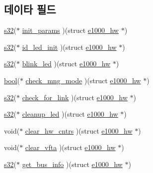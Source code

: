 \subsection*{데이타 필드}
\begin{DoxyCompactItemize}
\item 
\hyperlink{lib_2igb_2e1000__osdep_8h_ae9b1af5c037e57a98884758875d3a7c4}{s32}($\ast$ \hyperlink{structe1000__mac__operations_a9697a81cd453237323e05ff88409b12e}{init\+\_\+params} )(struct \hyperlink{structe1000__hw}{e1000\+\_\+hw} $\ast$)
\item 
\hyperlink{lib_2igb_2e1000__osdep_8h_ae9b1af5c037e57a98884758875d3a7c4}{s32}($\ast$ \hyperlink{structe1000__mac__operations_a067c24ad963badca2ab8fdbdcca1a8ca}{id\+\_\+led\+\_\+init} )(struct \hyperlink{structe1000__hw}{e1000\+\_\+hw} $\ast$)
\item 
\hyperlink{lib_2igb_2e1000__osdep_8h_ae9b1af5c037e57a98884758875d3a7c4}{s32}($\ast$ \hyperlink{structe1000__mac__operations_a596f43879eddf519677bea12106e88dd}{blink\+\_\+led} )(struct \hyperlink{structe1000__hw}{e1000\+\_\+hw} $\ast$)
\item 
\hyperlink{avb__gptp_8h_af6a258d8f3ee5206d682d799316314b1}{bool}($\ast$ \hyperlink{structe1000__mac__operations_ab5e076892629efd80daf8b037d216ef2}{check\+\_\+mng\+\_\+mode} )(struct \hyperlink{structe1000__hw}{e1000\+\_\+hw} $\ast$)
\item 
\hyperlink{lib_2igb_2e1000__osdep_8h_ae9b1af5c037e57a98884758875d3a7c4}{s32}($\ast$ \hyperlink{structe1000__mac__operations_a310026518db7151bd668f9751f30f719}{check\+\_\+for\+\_\+link} )(struct \hyperlink{structe1000__hw}{e1000\+\_\+hw} $\ast$)
\item 
\hyperlink{lib_2igb_2e1000__osdep_8h_ae9b1af5c037e57a98884758875d3a7c4}{s32}($\ast$ \hyperlink{structe1000__mac__operations_aaded575d7f1bf7152eb3ea72cf2ae601}{cleanup\+\_\+led} )(struct \hyperlink{structe1000__hw}{e1000\+\_\+hw} $\ast$)
\item 
void($\ast$ \hyperlink{structe1000__mac__operations_a687407cdf8743f5dab9f795eb868e7d8}{clear\+\_\+hw\+\_\+cntrs} )(struct \hyperlink{structe1000__hw}{e1000\+\_\+hw} $\ast$)
\item 
void($\ast$ \hyperlink{structe1000__mac__operations_ae387e054c349af2e0890f9853b8773f5}{clear\+\_\+vfta} )(struct \hyperlink{structe1000__hw}{e1000\+\_\+hw} $\ast$)
\item 
\hyperlink{lib_2igb_2e1000__osdep_8h_ae9b1af5c037e57a98884758875d3a7c4}{s32}($\ast$ \hyperlink{structe1000__mac__operations_a296d1a785e4fe3f39d43fd16bb067ee4}{get\+\_\+bus\+\_\+info} )(struct \hyperlink{structe1000__hw}{e1000\+\_\+hw} $\ast$)

\end{DoxyCompactItemize}
